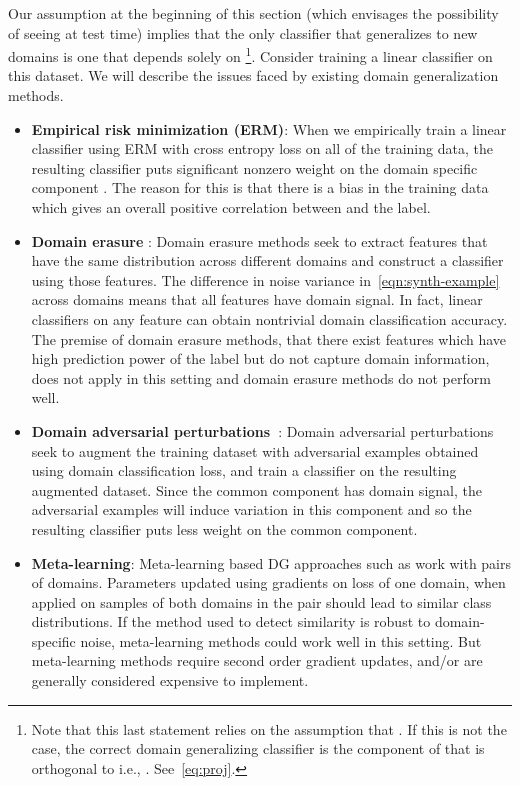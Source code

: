 \documentclass{article}
\begin{document}
Our assumption at the beginning of this section (which envisages the possibility of seeing  at test time) implies that the only classifier that generalizes to new domains is one that depends solely on  \footnote{Note that this last statement relies on the assumption that . 
If this is not the case, the correct domain generalizing classifier is the component of  that is orthogonal to  i.e., . See~\eqref{eq:proj}.}. Consider training a linear classifier on this dataset. We will describe the issues faced by existing domain generalization methods.
\begin{itemize}
    \item \textbf{Empirical risk minimization (ERM)}: When we empirically train a linear classifier using ERM with cross entropy loss on all of the training data,
the resulting classifier puts significant nonzero weight on the domain specific component . The reason for this is that there is a bias in the training data which gives an overall positive correlation between  and the label.
    \item \textbf{Domain erasure}  \cite{Ganin16}: Domain erasure methods seek to extract features that have the same distribution across different domains and construct a classifier using those features. The difference in noise variance in~\eqref{eqn:synth-example} across domains means that all features have domain signal. In fact, linear classifiers on any feature 
can obtain nontrivial domain classification accuracy. 
    The premise of domain erasure methods, that there exist features which have high prediction power of the label but do not capture domain information, does not apply in this setting and domain erasure methods do not perform well.
\item \textbf{Domain adversarial perturbations~\cite{VihariSSS18}}: Domain adversarial perturbations seek to augment the training dataset with adversarial examples obtained using domain classification loss, and train a classifier on the resulting augmented dataset. Since the common component  has domain signal, the adversarial examples will induce variation in this component and so the resulting classifier puts less weight on the common component.
     \item \textbf{Meta-learning}:
Meta-learning based DG approaches such as \cite{DouCK19} work with pairs of domains. Parameters updated using gradients on loss of one domain, when applied on samples of both domains in the pair should lead to similar class distributions.  If the method used to detect similarity is robust to domain-specific noise, meta-learning methods could work well in this setting.  But meta-learning methods require second order gradient updates, and/or are generally considered expensive to implement.     
\end{itemize}
\end{document}
